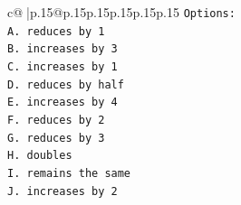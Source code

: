 \documentclass{article}
\begin{document}
{\begin{supertabular}{c@{$\;$}|p{.15\linewidth}@{}p{.15\linewidth}p{.15\linewidth}p{.15\linewidth}p{.15\linewidth}p{.15\linewidth}}
{{{\texttt{Options:} \\
\texttt{A. reduces by 1} \\
\texttt{B. increases by 3} \\
\texttt{C. increases by 1} \\
\texttt{D. reduces by half} \\
\texttt{E. increases by 4} \\
\texttt{F. reduces by 2} \\
\texttt{G. reduces by 3} \\
\texttt{H. doubles} \\
\texttt{I. remains the same} \\
\texttt{J. increases by 2} \\
            }
        }
    }
     \\ \\


\end{supertabular}}
\end{document}
